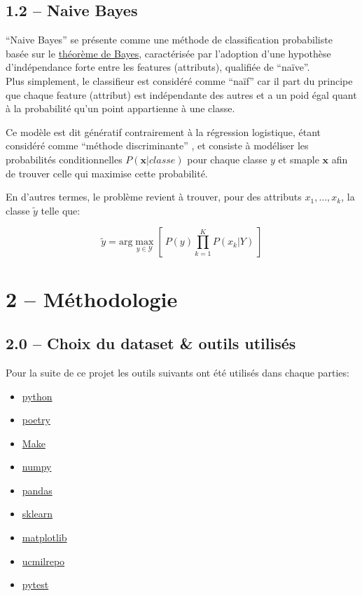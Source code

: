 \documentclass[
]{article}
\providecommand{\tightlist}{%
  \setlength{\itemsep}{0pt}\setlength{\parskip}{0pt}}
\begin{document}
\hypertarget{naive-bayes}{%
\subsection{1.2 -- Naive Bayes}\label{naive-bayes}}

``Naive Bayes'' se présente comme une méthode de classification
probabiliste basée sur le
\href{https://en.wikipedia.org/wiki/Bayes\%27_theorem}{théorème de
Bayes}, caractérisée par l'adoption d'une hypothèse d'indépendance forte
entre les features (attributs), qualifiée de ``naïve''.\\
Plus simplement, le classifieur est considéré comme ``naïf'' car il part
du principe que chaque feature (attribut) est indépendante des autres et
a un poid égal quant à la probabilité qu'un point appartienne à une
classe.

Ce modèle est dit génératif contrairement à la régression logistique,
étant considéré comme ``méthode discriminante''
\cite{ClassifieurLineaire2022}, et consiste à modéliser les probabilités
conditionnelles \(P(\mathbf{x}| classe)\) pour chaque classe \(y\) et
smaple \(\mathbf{x}\) afin de trouver celle qui maximise cette
probabilité.

En d'autres termes, le problème revient à trouver, pour des attributs
\(x_1, \ldots, x_k\), la classe \(\tilde{y}\) telle que:

\[
\tilde{y} = \text{arg}\max_{y \in \mathcal{Y}} \left[\  P(y) \prod_{k = 1}^K{P(x_k | Y)}\  \right]
\]

\newpage

\hypertarget{muxe9thodologie}{%
\section{2 -- Méthodologie}\label{muxe9thodologie}}

\hypertarget{choix-du-dataset-outils-utilisuxe9s}{%
\subsection{2.0 -- Choix du dataset \& outils
utilisés}\label{choix-du-dataset-outils-utilisuxe9s}}

Pour la suite de ce projet les outils suivants ont été utilisés dans
chaque parties:

\begin{itemize}
\tightlist
\item
  \href{https://www.python.org/}{python}
\item
  \href{https://python-poetry.org/}{poetry}
\item
  \href{https://www.gnu.org/software/make/}{Make}
\item
  \href{https://numpy.org/}{numpy}
\item
  \href{https://pandas.pydata.org/}{pandas}
\item
  \href{https://scikit-learn.org/stable/}{sklearn}
\item
  \href{https://matplotlib.org/}{matplotlib}
\item
  \href{https://github.com/uci-ml-repo/ucimlrepo}{ucmilrepo}
\item
  \href{https://docs.pytest.org/en/stable/}{pytest}
\end{itemize}
\end{document}
